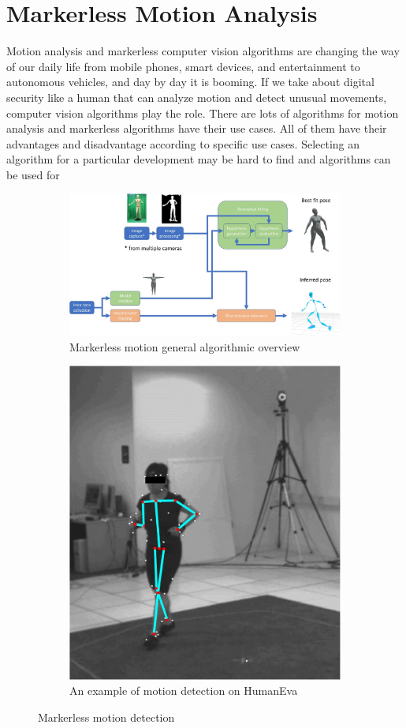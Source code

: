 \section{Markerless Motion Analysis}
Motion analysis and markerless computer vision algorithms are changing the way of our daily life from mobile phones, smart devices, and entertainment to autonomous vehicles, and day by day it is booming. If we take about digital security like a human that can analyze motion and detect unusual movements, computer vision algorithms play the role. There are lots of algorithms for motion analysis and markerless algorithms have their use cases. All of them have their advantages and disadvantage according to specific use cases. Selecting an algorithm for a particular development may be hard to find and algorithms can be used for
\begin{figure}[H] \center
\begin{subfigure}{.5\textwidth}
  \centering
  \includegraphics[width=.8\linewidth]{./figures/story-2-1.jpg}
  \caption{Markerless motion general algorithmic overview}
  \label{fig:algo-overview}
\end{subfigure}%
\begin{subfigure}{.5\textwidth}
  \centering
  \includegraphics[width=.8\linewidth]{./figures/story-2-2.jpg}
  \caption{An example of motion detection on HumanEva}
  \label{fig:motion-example}
\end{subfigure}%
\caption{Markerless motion detection\cite{colyer_review_2018}}
\label{fig:experimental-results}
\end{figure}
